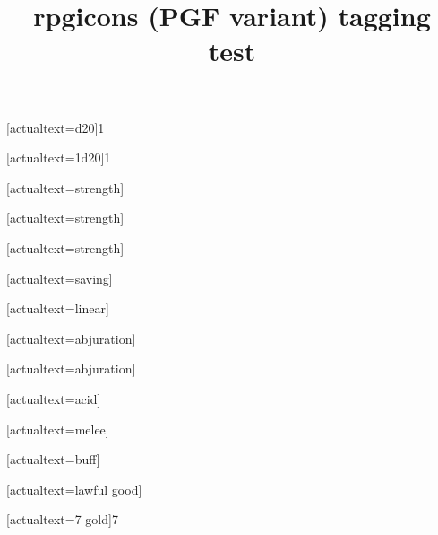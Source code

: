 \documentclass{article}
\title{rpgicons (PGF variant) tagging test}
\begin{document}
[actualtext={d20}]{1}

[actualtext={1d20}]{1}

[actualtext={strength}]

[actualtext={strength}]

[actualtext={strength}]

\saving[empty]{}[actualtext={saving}]

[actualtext={linear}]

[actualtext={abjuration}]

[actualtext={abjuration}]

[actualtext={acid}]

[actualtext={melee}]

[actualtext={buff}]

[actualtext={lawful good}]

[actualtext={7 gold}]{7}

\end{document}
